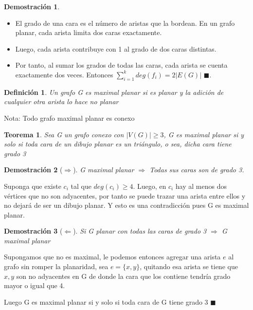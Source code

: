 \documentclass[a4paper,1pt]{report}
\newtheorem*{teo}{Teorema}
\newtheorem*{dem}{Demostración}
\newtheorem*{dfn}{Definición}
\begin{document}
\begin{dem}
 
\end{dem}

\begin{itemize}
 \item El grado de una cara es el número de aristas que la bordean. En un grafo planar, cada arista limita dos caras exactamente.
 \item Luego, cada arista contribuye con 1 al grado de dos caras distintas.
 \item Por tanto, al sumar los grados de todas las caras, cada arista se cuenta exactamente dos veces. Entonces $\sum^k_{i=1}deg(f_i)=2|E(G)|$ $\blacksquare$.
\end{itemize}


\begin{dfn}
 Un grafo G es maximal planar si es planar y la adición de cualquier otra arista lo hace no planar
\end{dfn}

Nota: Todo grafo maximal planar es conexo

\begin{teo}
 Sea G un grafo conexo con $|V(G)|\geq 3$, G es maximal planar si y solo si toda cara de un dibujo planar es un triángulo, o sea,  dicha cara tiene grado 3
\end{teo}

\begin{dem}[$\Rightarrow$]
  G maximal planar $\Rightarrow$ Todas sus caras son de grado 3.
\end{dem}

Suponga que existe $c_i$ tal que $deg(c_i)\geq 4$. Luego, en $c_i$ hay al menos dos vértices que no son adyacentes, por tanto se puede trazar una arista entre ellos y no dejará de ser un dibujo planar. Y esto es una contradicción pues G es maximal planar.\\

\begin{dem}[$\Leftarrow$]
    Si G planar con todas las caras de grado 3 $\Rightarrow$ G maximal planar
\end{dem}

Supongamos que no es maximal, le podemos entonces agregar una arista $e$ al grafo sin romper la planaridad, sea $e = \{x,y\}$, quitando esa arista se tiene que $x, y$ son no adyacentes en G de donde la cara que los contiene tendr\'ia grado mayor o igual que 4. 

Luego G es maximal planar si y solo si toda cara de G tiene grado 3 $\blacksquare$
\end{document}
